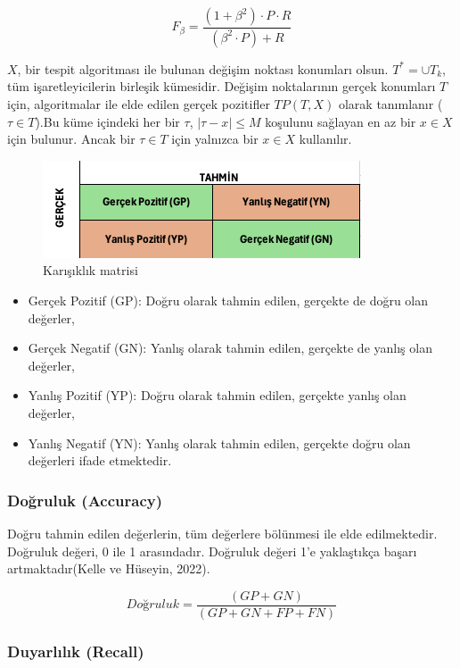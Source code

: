 \documentclass[12pt,twoside]{deuthesis}
\providecommand{\tightlist}{%
  \setlength{\itemsep}{0pt}\setlength{\parskip}{0pt}}
\begin{document}
\[F_{\beta} = \frac{(1 + \beta^2) \cdot P \cdot R}{(\beta^2 \cdot P) + R}\]

\(X\), bir tespit algoritması ile bulunan değişim noktası konumları olsun. \(T^* = \cup T_k\), tüm işaretleyicilerin birleşik kümesidir. Değişim noktalarının gerçek konumları \(T\) için, algoritmalar ile elde edilen gerçek pozitifler \(TP(T, X)\) olarak tanımlanır (\(\tau \in T\)).Bu küme içindeki her bir \(\tau\), \(|\tau - x| \leq M\) koşulunu sağlayan en az bir \(x \in X\) için bulunur. Ancak bir \(\tau \in T\) için yalnızca bir \(x \in X\) kullanılır.

\begin{figure}
\includegraphics[width=357px,height=109px]{figure/conmat} \caption{Karışıklık matrisi}\label{fig:unnamed-chunk-2}
\end{figure}

\begin{itemize}
\tightlist
\item
  Gerçek Pozitif (GP): Doğru olarak tahmin edilen, gerçekte de doğru olan değerler,
\item
  Gerçek Negatif (GN): Yanlış olarak tahmin edilen, gerçekte de yanlış olan değerler,
\item
  Yanlış Pozitif (YP): Doğru olarak tahmin edilen, gerçekte yanlış olan değerler,
\item
  Yanlış Negatif (YN): Yanlış olarak tahmin edilen, gerçekte doğru olan değerleri ifade etmektedir.
\end{itemize}

\hypertarget{doux11fruluk-accuracy}{%
\subsubsection{Doğruluk (Accuracy)}\label{doux11fruluk-accuracy}}

Doğru tahmin edilen değerlerin, tüm değerlere bölünmesi ile elde edilmektedir. Doğruluk değeri, 0 ile 1 arasındadır. Doğruluk değeri 1'e yaklaştıkça başarı artmaktadır(Kelle ve Hüseyin, 2022).

\[Doğruluk = \frac{(GP + GN)}{(GP + GN + FP + FN)}\]

\hypertarget{duyarlux131lux131k-recall}{%
\subsubsection{Duyarlılık (Recall)}\label{duyarlux131lux131k-recall}}
\end{document}
